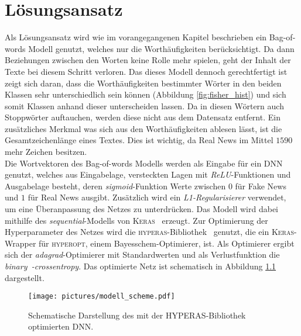 \chapter{Lösungsansatz}
Als Lösungsansatz wird wie im vorangegangenen Kapitel beschrieben ein Bag-of-words Modell 
genutzt, welches nur die Worthäufigkeiten berücksichtigt. Da dann Beziehungen zwischen
den Worten keine Rolle mehr spielen, geht der Inhalt der Texte bei diesem Schritt verloren.
Das dieses Modell dennoch gerechtfertigt ist zeigt sich daran, dass die Worthäufigkeiten
bestimmter Wörter in den beiden Klassen sehr unterschiedlich sein können (Abbildung \ref{fig:fisher_hist})
und sich somit Klassen anhand dieser unterscheiden lassen. Da in diesen Wörtern auch Stoppwörter
auftauchen, werden diese nicht aus dem Datensatz entfernt. Ein zusätzliches Merkmal was sich 
aus den Worthäufigkeiten ablesen lässt, ist die Gesamtzeichenlänge eines Textes. Dies ist wichtig,
da Real News im Mittel $1590$ mehr Zeichen besitzen.  \\
Die Wortvektoren des Bag-of-words Modells werden als Eingabe für ein DNN genutzt, welches 
aus Eingabelage, versteckten Lagen mit \textit{ReLU}-Funktionen und Ausgabelage besteht, deren \textit{sigmoid}-Funktion
Werte zwischen $0$ für Fake News und $1$ für Real News ausgibt. Zusätzlich wird ein 
\textit{L1-Regularisierer} verwendet, um eine Überanpassung des Netzes zu unterdrücken.
Das Modell wird dabei mithilfe 
des \textit{sequential}-Modells von \textsc{Keras}~\cite{keras} erzeugt.
Zur Optimierung der Hyperparameter des Netzes wird die \textsc{hyperas}-Bibliothek~\cite{hyperas} genutzt, die 
ein \textsc{Keras}-Wrapper für \textsc{hyperopt}, einem Bayesschem-Optimierer, ist. Als Optimierer
ergibt sich der \textit{adagrad}-Optimierer mit Standardwerten und als Verlustfunktion die 
\textit{binary~-crossentropy}. Das optimierte Netz ist schematisch in Abbildung \ref{fig:DNN_model}
dargestellt.

\begin{figure}
    \centering
    \texttt{[image: pictures/modell\_scheme.pdf]}
    \caption{Schematische Darstellung des mit der \textsc{HYPERAS}-Bibliothek~\cite{hyperas} 
    optimierten DNN.}
    \label{fig:DNN_model}
\end{figure}




